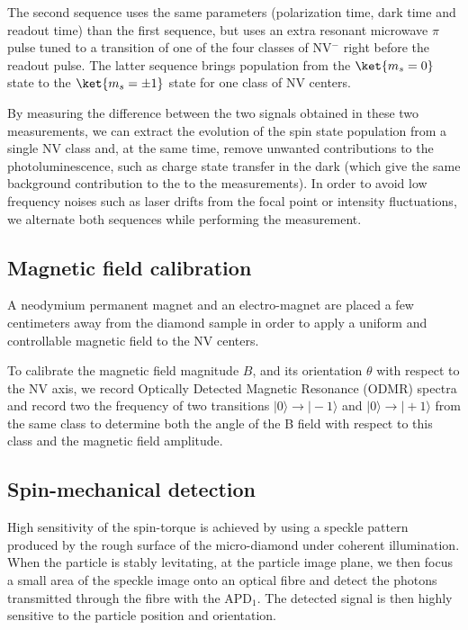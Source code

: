 \documentclass[preprintnumbers,amsmath,amssymb,onecolumn,12pt]{revtex4}
\begin{document}
The second sequence uses the same parameters (polarization time, dark time and readout time) than the first sequence, but uses an extra resonant microwave $\pi$ pulse tuned to a transition of one of the four classes of NV$^-$ right before the readout pulse. The latter sequence brings population from the $\ket{m_s=0}$ state to the $\ket{m_s=\pm 1}$ state for one class of NV centers.

By measuring the difference between the two signals obtained in these two measurements, we can extract the evolution of the spin state population from a single NV class and, at the same time, remove unwanted contributions to the photoluminescence, such as charge state transfer in the dark (which give the same background contribution to the to the measurements).
In order to avoid low frequency noises such as laser drifts from the focal point or intensity fluctuations, we alternate both sequences while performing the measurement.

\subsection{Magnetic field calibration}

A neodymium permanent magnet and an electro-magnet are placed a few centimeters away from the diamond sample in order to apply a uniform and controllable magnetic field to the NV centers. 

To calibrate the magnetic field magnitude $B$, and its orientation $\theta$ with respect to the NV axis, we record Optically Detected Magnetic Resonance (ODMR) spectra and record two the frequency of two transitions $|0 \rangle \rightarrow |-1\rangle$ and $|0 \rangle \rightarrow |+1\rangle$ from the same class to determine both the angle of the B field with respect to this class and the magnetic field amplitude. 

\subsection{Spin-mechanical detection}

High sensitivity of the spin-torque is achieved by using a speckle pattern produced by the rough surface of the micro-diamond under coherent illumination. When the particle is stably levitating, at the particle image plane, we then focus a small area of the speckle image onto an optical fibre and detect the photons transmitted through the fibre with the APD$_1$. The detected signal is then highly sensitive to the particle position and orientation.
\end{document}
